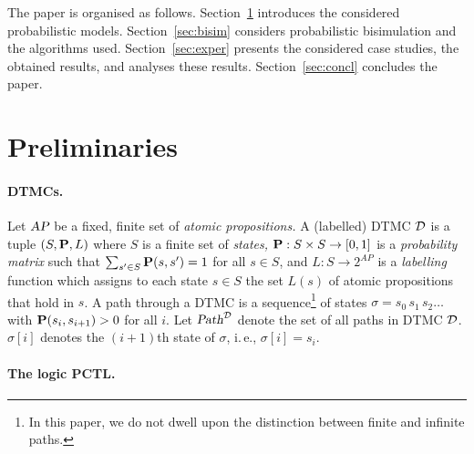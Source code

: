 \documentclass{llncs}
\begin{document}
The paper is organised as follows.
Section~\ref{sec:basics} introduces the considered probabilistic models.
Section~\ref{sec:bisim} considers probabilistic bisimulation and the algorithms used.
Section~\ref{sec:exper} presents the considered case studies, the obtained results, and 
analyses these results.
Section~\ref{sec:concl} concludes the paper. 

\section{Preliminaries}
\label{sec:basics}

\paragraph{DTMCs.}

        Let $\mbox{\sl AP}$ be a fixed, finite set of \emph{atomic propositions.}
        A (labelled) DTMC $\mathcal{D}$ is a tuple $(S,\mathbf{P},L)$
        where $S$ is a finite set of \emph{states,}
        $\mathbf{P}: S \times S \to [0,1]$ is a \emph{probability matrix}
        such that $\sum_{s' \in S} \mathbf{P}(s,s') = 1$ for all $s \in S$,
        and $L : S \to 2^\mathit{AP}$ is a \emph{labelling} function
        which assigns to each state $s \in S$
        the set $L(s)$ of atomic propositions that hold in $s$.
        A path through a DTMC is a sequence\footnote{In
                this paper, we do not dwell upon the distinction between finite and infinite paths.}
        of states $\sigma = s_0 \, s_1 \, s_2 \ldots$
        with $\mathbf{P}(s_i,s_{i{+}1}) > 0$ for all $i$.
        Let $\mbox{\sl Path}^{\mathcal{D}}$ denote the set of all paths in DTMC $\mathcal{D}$.
        $\sigma[i]$ denotes the $(i{+}1)$th state of $\sigma$,
        i.\,e.\@, $\sigma[i] = s_i$.

\paragraph{The logic PCTL.}
\end{document}
